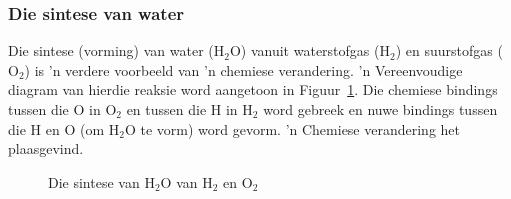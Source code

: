 \subsubsection*{Die sintese van water}
\label{m38709*id62788}Die sintese (vorming) van water ($\text{H}_{2}\text{O}$) vanuit waterstofgas ($\text{H}_{2}$) en suurstofgas ($\text{O}_{2}$) is 'n verdere voorbeeld van 'n chemiese verandering. 'n Vereenvoudige diagram van hierdie reaksie word aangetoon in Figuur~\ref{fig:chemical change:synthesis}. Die chemiese bindings tussen die $\text{O}$ in $\text{O}_{2}$ en tussen die $\text{H}$ in $\text{H}_{2}$ word gebreek en nuwe bindings tussen die $\text{H}$ en $\text{O}$ (om $\text{H}_{2}\text{O}$ te vorm) word gevorm. 'n Chemiese verandering het plaasgevind.\par 
    \setcounter{subfigure}{0}
\begin{figure}[H]
\begin{center}
\end{center}
\caption{Die sintese van $\text{H}_{2}\text{O}$ van $\text{H}_{2}$ en $\text{O}_{2}$}
\label{fig:chemical change:synthesis}
\end{figure} 
\label{m38709*secfhsst!!!underscore!!!id163}

